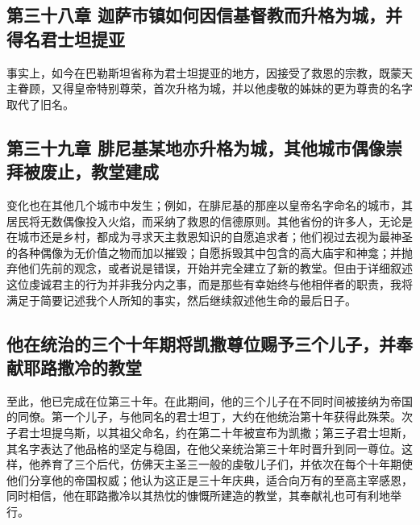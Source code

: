 
\subsection{第三十八章 迦萨市镇如何因信基督教而升格为城，并得名君士坦提亚}

事实上，如今在巴勒斯坦省称为君士坦提亚的地方，因接受了救恩的宗教，既蒙天主眷顾，又得皇帝特别尊荣，首次升格为城，并以他虔敬的姊妹的更为尊贵的名字取代了旧名。\par


\subsection{第三十九章 腓尼基某地亦升格为城，其他城市偶像崇拜被废止，教堂建成}

变化也在其他几个城市中发生；例如，在腓尼基的那座以皇帝名字命名的城市，其居民将无数偶像投入火焰，而采纳了救恩的信德原则。其他省份的许多人，无论是在城市还是乡村，都成为寻求天主救恩知识的自愿追求者；他们视过去视为最神圣的各种偶像为无价值之物而加以摧毁；自愿拆毁其中包含的高大庙宇和神龛；并抛弃他们先前的观念，或者说是错误，开始并完全建立了新的教堂。但由于详细叙述这位虔诚君主的行为并非我分内之事，而是那些有幸始终与他相伴者的职责，我将满足于简要记述我个人所知的事实，然后继续叙述他生命的最后日子。\par


\subsection{他在统治的三个十年期将凯撒尊位赐予三个儿子，并奉献耶路撒冷的教堂}

至此，他已完成在位第三十年。在此期间，他的三个儿子在不同时间被接纳为帝国的同僚。第一个儿子，与他同名的君士坦丁，大约在他统治第十年获得此殊荣。次子君士坦提乌斯，以其祖父命名，约在第二十年被宣布为凯撒；第三子君士坦斯，其名字表达了他品格的坚定与稳固，在他父亲统治第三十年时晋升到同一尊位。这样，他养育了三个后代，仿佛天主圣三一般的虔敬儿子们，并依次在每个十年期使他们分享他的帝国权威；他认为这正是三十年庆典，适合向万有的至高主宰感恩，同时相信，他在耶路撒冷以其热忱的慷慨所建造的教堂，其奉献礼也可有利地举行。\par

